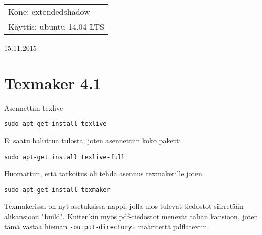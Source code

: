 \documentclass[main.tex]{subfiles}
\begin{document}
\thispagestyle{empty}
\begin{tabular}[t]{l}
Kone: extendedshadow\\
Käyttis: ubuntu 14.04 LTS
\end{tabular}
\hfill 15.11.2015

{\section{Texmaker 4.1}}
Asennettiin texlive

\begin{lstlisting}
sudo apt-get install texlive
\end{lstlisting}

Ei saatu haluttua tulosta, joten asennettiin koko paketti

\begin{lstlisting}
sudo apt-get install texlive-full
\end{lstlisting}

Huomattiin, että tarkoitus oli tehdä asennus texmakerille joten

\begin{lstlisting}
sudo apt-get install texmaker
\end{lstlisting}

Texmakerissa on nyt asetuksissa nappi, jolla ulos tulevat tiedostot siirretään alikansioon "build". Kuitenkin myös pdf-tiedostot menevät tähän kansioon, joten tämä vastaa hieman \texttt{-output-directory=} määritettä pdflatexiin.
\end{document}
